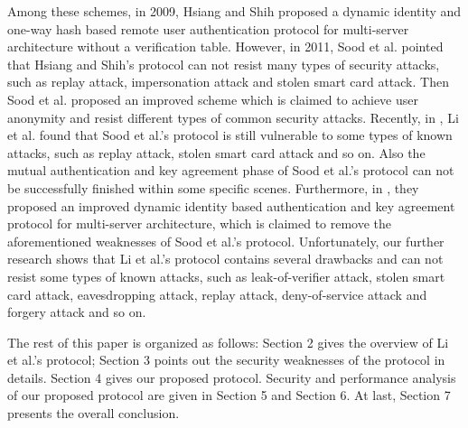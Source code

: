 \documentclass[preprint,12pt]{elsarticle}
\begin{document}
Among these schemes, in 2009, Hsiang and Shih proposed a dynamic identity and one-way hash based remote user authentication protocol for multi-server architecture without a verification table\cite{passwd-based-multi1}. However, in 2011, Sood et al.\cite{passwd-based-multi2} pointed that Hsiang and Shih's protocol can not resist many types of security attacks, such as replay attack, impersonation attack and stolen smart card attack. Then Sood et al. proposed an improved scheme which is claimed to achieve user anonymity and resist different types of common security attacks. Recently, in \cite{passwd-based-multi7}, Li et al. found that Sood et al.'s protocol is still vulnerable to some types of known attacks, such as replay attack, stolen smart card attack and so on. Also the mutual authentication and key agreement phase of Sood et al.'s protocol can not be successfully finished within some specific scenes. Furthermore, in \cite{passwd-based-multi7}, they proposed an improved dynamic identity based authentication and key agreement protocol for multi-server architecture, which is claimed to remove the aforementioned weaknesses of Sood et al.'s protocol. Unfortunately, our further research shows that Li et al.'s protocol contains several drawbacks and can not resist some types of known attacks, such as leak-of-verifier attack, stolen smart card attack, eavesdropping attack, replay attack, deny-of-service attack and forgery attack and so on.


The rest of this paper is organized as follows: Section 2 gives the overview of Li et al.'s protocol; Section 3 points out the security weaknesses of the protocol in details. Section 4 gives our proposed protocol. Security and performance analysis of our proposed protocol are given in Section 5 and Section 6. At last, Section 7 presents the overall conclusion. 	
\end{document}

